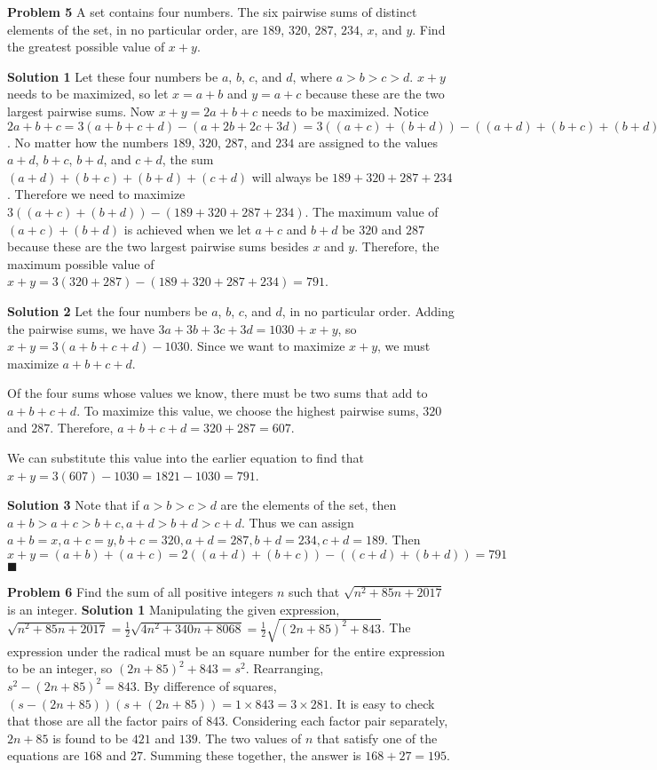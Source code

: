 \documentclass[a4paper,11pt]{article}
\begin{document}
\textbf{Problem 5}
A set contains four numbers. The six pairwise sums of distinct elements of the set, in no particular order, are $189$, $320$, $287$, $234$, $x$, and $y$. Find the greatest possible value of $x+y$.

\textbf{Solution 1}
Let these four numbers be $a$, $b$, $c$, and $d$, where $a>b>c>d$. $x+y$ needs to be maximized, so let $x=a+b$ and $y=a+c$ because these are the two largest pairwise sums. Now $x+y=2a+b+c$ needs to be maximized. Notice $2a+b+c=3(a+b+c+d)-(a+2b+2c+3d)=3((a+c)+(b+d))-((a+d)+(b+c)+(b+d)+(c+d))$. No matter how the numbers $189$, $320$, $287$, and $234$ are assigned to the values $a+d$, $b+c$, $b+d$, and $c+d$, the sum $(a+d)+(b+c)+(b+d)+(c+d)$ will always be $189+320+287+234$. Therefore we need to maximize $3((a+c)+(b+d))-(189+320+287+234)$. The maximum value of $(a+c)+(b+d)$ is achieved when we let $a+c$ and $b+d$ be $320$ and $287$ because these are the two largest pairwise sums besides $x$ and $y$. Therefore, the maximum possible value of $x+y=3(320+287)-(189+320+287+234)=\boxed{791}$.

\textbf{Solution 2}
Let the four numbers be $a$, $b$, $c$, and $d$, in no particular order. Adding the pairwise sums, we have $3a+3b+3c+3d=1030+x+y$, so $x+y=3(a+b+c+d)-1030$. Since we want to maximize $x+y$, we must maximize $a+b+c+d$.

Of the four sums whose values we know, there must be two sums that add to $a+b+c+d$. To maximize this value, we choose the highest pairwise sums, $320$ and $287$. Therefore, $a+b+c+d=320+287=607$.

We can substitute this value into the earlier equation to find that $x+y=3(607)-1030=1821-1030=\boxed{791}$.

\textbf{Solution 3}
Note that if $a>b>c>d$ are the elements of the set, then $a+b>a+c>b+c,a+d>b+d>c+d$. Thus we can assign $a+b=x,a+c=y,b+c=320,a+d=287,b+d=234,c+d=189$. Then $x+y=(a+b)+(a+c)=2((a+d)+(b+c))-((c+d)+(b+d))=791$ \hfill $\blacksquare$

\textbf{Problem 6}
Find the sum of all positive integers $n$ such that $\sqrt{n^2+85n+2017}$ is an integer.
\textbf{
Solution 1}
Manipulating the given expression, $\sqrt{n^2+85n+2017}=\frac{1}{2}\sqrt{4n^2+340n+8068}=\frac{1}{2}\sqrt{(2n+85)^2+843}$. The expression under the radical must be an square number for the entire expression to be an integer, so $(2n+85)^2+843=s^2$. Rearranging, $s^2-(2n+85)^2=843$. By difference of squares, $(s-(2n+85))(s+(2n+85))=1\times843=3\times281$. It is easy to check that those are all the factor pairs of 843. Considering each factor pair separately, $2n+85$ is found to be $421$ and $139$. The two values of $n$ that satisfy one of the equations are $168$ and $27$. Summing these together, the answer is $168+27=\boxed{195}$.
\end{document}

